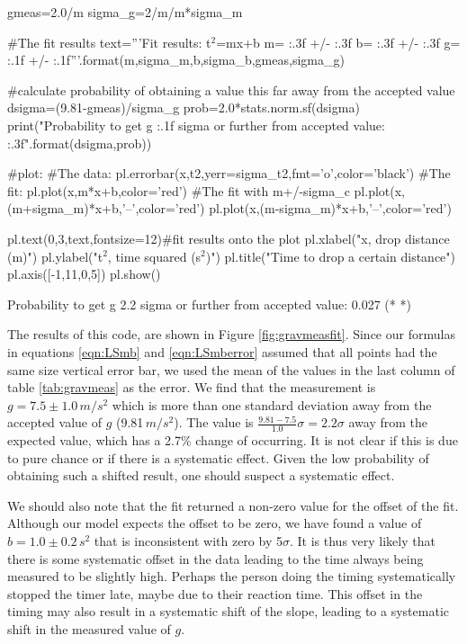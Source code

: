 \begin{example}
\begin{python}[caption = Linear fit with least squares]
gmeas=2.0/m
sigma_g=2/m/m*sigma_m

#The fit results
text='''Fit results: t$^2$=mx+b
m= {:.3f} +/- {:.3f}
b= {:.3f} +/- {:.3f}
g= {:.1f} +/- {:.1f}'''.format(m,sigma_m,b,sigma_b,gmeas,sigma_g)

#calculate probability of obtaining a value this far away from the accepted value
dsigma=(9.81-gmeas)/sigma_g
prob=2.0*stats.norm.sf(dsigma)
print("Probability to get g {:.1f} sigma or further from accepted value: {:.3f}".format(dsigma,prob))

#plot:
#The data:
pl.errorbar(x,t2,yerr=sigma_t2,fmt='o',color='black')
#The fit:
pl.plot(x,m*x+b,color='red')
#The fit with m+/-sigma_c
pl.plot(x,(m+sigma_m)*x+b,'--',color='red')
pl.plot(x,(m-sigma_m)*x+b,'--',color='red')

pl.text(0,3,text,fontsize=12)#fit results onto the plot
pl.xlabel("x, drop distance (m)")
pl.ylabel("t$^2$, time squared (s$^2$)")
pl.title("Time to drop a certain distance")
pl.axis([-1,11,0,5])
pl.show()

\end{python}
\begin{poutput}
Probability to get g 2.2 sigma or further from accepted value: 0.027
(*  *)
\end{poutput}
The results of this code, are shown in Figure \ref{fig:gravmeasfit}. Since our formulas in equations \ref{eqn:LSmb} and \ref{eqn:LSmberror} assumed that all points had the same size vertical error bar, we used the mean of the values in the last column of table \ref{tab:gravmeas} as the error. We find that the measurement is $g=7.5\pm1.0\, m/s^2$ which is more than one standard deviation away from the accepted value of $g$ (9.81\,$m/s^2$). The value is $\frac{9.81-7.5}{1.0}\sigma=2.2\sigma$ away from the expected value, which has a 2.7\% change of occurring. It is not clear if this is due to pure chance or if there is a systematic effect. Given the low probability of obtaining such a shifted result, one should suspect a systematic effect. 

We should also note that the fit returned a non-zero value for the offset of the fit. Although our model expects the offset to be zero, we have found a value of $b=1.0\pm0.2\,s^2$ that is inconsistent with zero by 5$\sigma$. It is thus very likely that there is some systematic offset in the data leading to the time always being measured to be slightly high. Perhaps the person doing the timing systematically stopped the timer late, maybe due to their reaction time. This offset in the timing may also result in a systematic shift of the slope, leading to a systematic shift in the measured value of $g$. 


\end{example}
